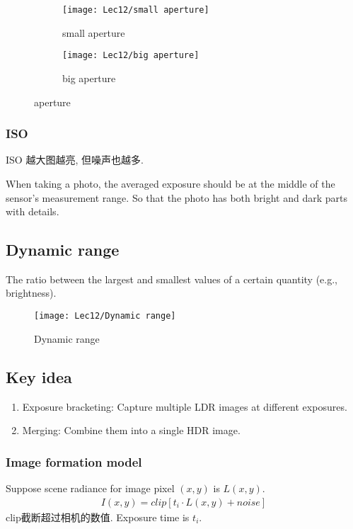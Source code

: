 \begin{figure}[H]
    \centering
    \begin{subfigure}{0.618\textwidth}
        \centering
        \texttt{[image: Lec12/small aperture]}
        \caption{small aperture}
    \end{subfigure}

    \begin{subfigure}{0.618\textwidth}
        \centering
        \texttt{[image: Lec12/big aperture]}
        \caption{big aperture}
    \end{subfigure}
    \caption{aperture}
\end{figure}

\subsubsection{ISO}
ISO 越大图越亮, 但噪声也越多. 

When taking a photo, the averaged exposure should be at the middle of the sensor’s measurement range. So that the photo has both bright and dark parts with details.


\subsection{Dynamic range}
The ratio between the largest and smallest values of a certain quantity (e.g., brightness). 

\begin{figure}[H]
    \centering
    \texttt{[image: Lec12/Dynamic range]}
    \caption{Dynamic range}
\end{figure}

\subsection{Key idea}
\begin{enumerate}
    \item Exposure bracketing: Capture multiple LDR images at different exposures. 
    \item Merging: Combine them into a single HDR image. 
\end{enumerate}


\subsubsection{Image formation model}
Suppose scene radiance for image pixel $(x, y)$ is $L(x, y)$. 
\begin{align*}
    I(x,y)=clip\left[ t_i\cdot L(x,y)+noise \right]
\end{align*}
clip截断超过相机的数值. Exposure time is $t_i$. 

